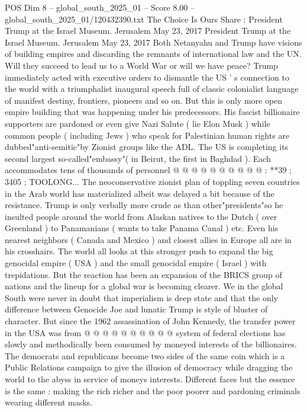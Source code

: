 \begin{textsample}{POS Dim 8 – global\_south\_2025\_01 – Score 8.00 – global\_south\_2025\_01/120432390.txt}  \label{ex:f8_pos_120}
The Choice Is Ours Share : President Trump at the Israel Museum.
Jerusalem May 23, 2017 President Trump at the Israel Museum.
Jerusalem May 23, 2017 Both Netanyahu and Trump have visions of building empires and discarding the remnants of international law and the UN.
Will they succeed to lead us to a World War or will we have peace?
Trump immediately acted with executive orders to dismantle the US ' s connection to the world with a triumphalist inaugural speech full of classic colonialist language of manifest destiny, frontiers, pioneers and so on.
But this is only more open empire building that was happening under his predecessors.
His fascist billionaire supporters are pardoned or even give Nazi Salute ( lie Elon Musk ) while common people ( including Jews ) who speak for Palestinian human rights are dubbed"anti-semitic"by Zionist groups like the ADL.
The US is completing its second largest so-called"embassy"( in Beirut, the first in Baghdad ).
Each accommodates tens of thousands of personnel @ @ @ @ @ @ @ @ @ @ : **39 ; 3405 ; TOOLONG...
The neoconservative zionist plan of toppling seven countries in the Arab world has materialized albeit was delayed a bit because of the resistance.
Trump is only verbally more crude as than other"presidents"so he insulted people around the world from Alaskan natives to the Dutch ( over Greenland ) to Panamanians ( wants to take Panama Canal ) etc.
Even his nearest neighbors ( Canada and Mexico ) and closest allies in Europe all are in his crosshairs.
The world all looks at this stronger push to expand the big genocidal empire ( USA ) and the small genocidal empire ( Israel ) with trepidations.
But the reaction has been an expansion of the BRICS group of nations and the lineup for a global war is becoming clearer.
We in the global South were never in doubt that imperialism is deep state and that the only difference between Genocide Joe and lunatic Trump is style of bluster of character.
But since the 1962 assassination of John Kennedy, the transfer power in the USA was from @ @ @ @ @ @ @ @ @ @ system of federal elections has slowly and methodically been consumed by moneyed interests of the billionaires.
The democrats and republicans become two sides of the same coin which is a Public Relations campaign to give the illusion of democracy while dragging the world to the abyss in service of moneys interests.
Different faces but the essence is the same : making the rich richer and the poor poorer and pardoning criminals wearing different masks.

\end{textsample}
